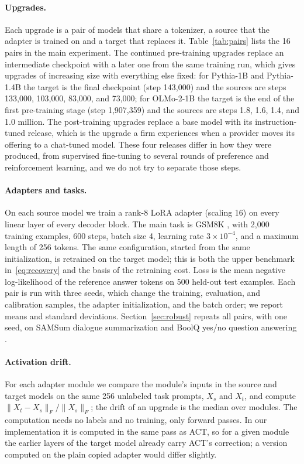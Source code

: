 \documentclass[ijds,nonblindrev]{informs4}
\begin{document}
\paragraph{Upgrades.} Each upgrade is a pair of models that share a tokenizer, a source that the adapter is trained on and a target that replaces it. Table~\ref{tab:pairs} lists the 16 pairs in the main experiment. The continued pre-training upgrades replace an intermediate checkpoint with a later one from the same training run, which gives upgrades of increasing size with everything else fixed: for Pythia-1B and Pythia-1.4B the target is the final checkpoint (step 143{,}000) and the sources are steps 133{,}000, 103{,}000, 83{,}000, and 73{,}000; for OLMo-2-1B the target is the end of the first pre-training stage (step 1{,}907{,}359) and the sources are steps 1.8, 1.6, 1.4, and 1.0 million. The post-training upgrades replace a base model with its instruction-tuned release, which is the upgrade a firm experiences when a provider moves its offering to a chat-tuned model. These four releases differ in how they were produced, from supervised fine-tuning to several rounds of preference and reinforcement learning, and we do not try to separate those steps.

\paragraph{Adapters and tasks.} On each source model we train a rank-8 LoRA adapter (scaling 16) on every linear layer of every decoder block. The main task is GSM8K \citep{cobbe2021gsm8k}, with 2{,}000 training examples, 600 steps, batch size 4, learning rate $3\times10^{-4}$, and a maximum length of 256 tokens. The same configuration, started from the same initialization, is retrained on the target model; this is both the upper benchmark in~\eqref{eq:recovery} and the basis of the retraining cost. Loss is the mean negative log-likelihood of the reference answer tokens on 500 held-out test examples. Each pair is run with three seeds, which change the training, evaluation, and calibration samples, the adapter initialization, and the batch order; we report means and standard deviations. Section~\ref{sec:robust} repeats all pairs, with one seed, on SAMSum dialogue summarization \citep{gliwa2019samsum} and BoolQ yes/no question answering \citep{clark2019boolq}.

\paragraph{Activation drift.} For each adapter module we compare the module's inputs in the source and target models on the same 256 unlabeled task prompts, $X_s$ and $X_t$, and compute $\|X_t-X_s\|_F/\|X_s\|_F$; the drift of an upgrade is the median over modules. The computation needs no labels and no training, only forward passes. In our implementation it is computed in the same pass as ACT, so for a given module the earlier layers of the target model already carry ACT's correction; a version computed on the plain copied adapter would differ slightly.
\end{document}
